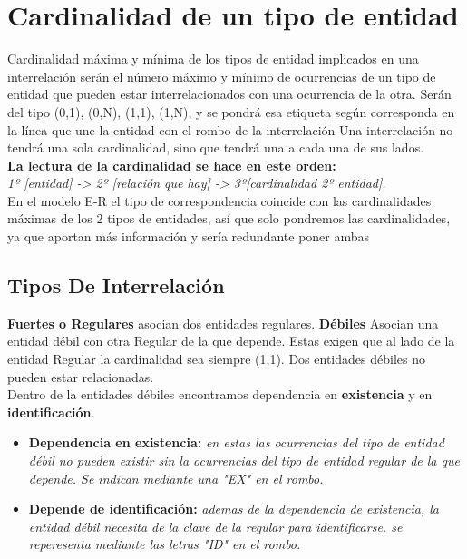 \documentclass{article}
\begin{document}
\section{Cardinalidad de un tipo de entidad}
Cardinalidad máxima y mínima de los tipos de entidad implicados en una interrelación serán el número máximo y mínimo de ocurrencias de un tipo de entidad que pueden estar interrelacionados con una 
ocurrencia de la otra. Serán del tipo (0,1), (0,N), (1,1), (1,N), y se pondrá esa etiqueta según corresponda en la línea que une la entidad con el rombo de la interrelación Una interrelación no 
tendrá una sola cardinalidad, sino que tendrá una a cada una de sus lados.
\\
\textbf{La lectura de la cardinalidad se hace en este orden:}\\
\textit{1º [entidad] -> 2º [relación que hay] -> 3º[cardinalidad 2º entidad].}
\\
En el modelo E-R el tipo de correspondencia coincide con las cardinalidades máximas de los 2 tipos de entidades, así que solo pondremos las cardinalidades, ya que aportan más información y sería 
redundante poner ambas

\newpage
\subsection{Tipos De Interrelación}
\textbf{Fuertes o Regulares} asocian dos entidades regulares.
\textbf{Débiles} Asocian una entidad débil con otra Regular de la que depende. Estas exigen que al lado de la entidad Regular la cardinalidad sea siempre (1,1). Dos entidades débiles no pueden estar 
relacionadas.
\\
Dentro de la entidades débiles encontramos dependencia en \textbf{existencia} y en \textbf{identificación}.
\begin{itemize}
    \item \textbf{Dependencia en existencia:} \textit{en estas las ocurrencias del tipo de entidad débil no pueden existir sin la ocurrencias del tipo de entidad regular de la que depende. Se indican 
    mediante una "EX" en el rombo.}
    \item \textbf{Depende de identificación:} \textit{ademas de la dependencia de existencia, la entidad débil necesita de la clave de la regular
    para identificarse. se reperesenta mediante las letras "ID" en el rombo.}
\end{itemize}
\end{document}
